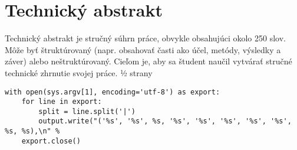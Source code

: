 \chapter{Technický abstrakt}

\par{
Technický abstrakt je stručný súhrn práce, obvykle obsahujúci okolo 250 slov. Môže byť štruktúrovaný (napr. obsahovať časti ako účel, metódy, výsledky a záver) alebo neštruktúrovaný. Cieľom je, aby sa študent naučil vytvárať stručné technické zhrnutie svojej práce. {\btHL ½ strany}
}

\begin{verbatim}
with open(sys.argv[1], encoding='utf-8') as export:
	for line in export:
		split = line.split('|')
		output.write("('%s', '%s', %s, '%s', '%s', '%s', '%s', '%s', %s, %s),\n" %
	export.close()
\end{verbatim}
